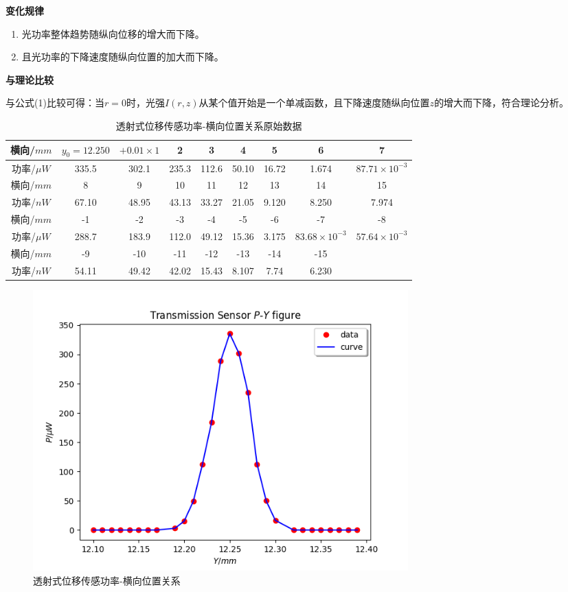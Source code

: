 \documentclass[a4paper,UTF8]{ctexart}
\begin{document}
{\bfseries 变化规律}

\begin{enumerate}
    \item 光功率整体趋势随纵向位移的增大而下降。
    \item 且光功率的下降速度随纵向位置的加大而下降。
\end{enumerate}

{\bfseries 与理论比较}

与公式(1)比较可得：当$r=0$时，光强$I(r,z)$从某个值开始是一个单减函数，且下降速度随纵向位置$z$的增大而下降，符合理论分析。

\begin{table}[H]
    \centering
    \begin{tabular}{|c|c|c|c|c|c|c|c|c|}
    \hline
        横向/$mm$ & $y_0 = 12.250$ & $+0.01 \times 1$ & 2 & 3 & 4 & 5 & 6 & 7 \\ \hline
        功率/$\mu W$ & 335.5 & 302.1 & 235.3 & 112.6 & 50.10 & 16.72 & 1.674 & $87.71 \times 10^{-3}$ \\ \hline
        横向/$mm$ & 8 & 9 & 10 & 11 & 12 & 13 & 14 & 15 \\ \hline
        功率/$n W$ & 67.10 & 48.95 & 43.13 & 33.27 & 21.05 & 9.120 & 8.250 & 7.974 \\ \hline
        横向/$mm$ & -1 & -2 & -3 & -4 & -5 & -6 & -7 & -8 \\ \hline
        功率/$\mu W$ & 288.7 & 183.9 & 112.0 & 49.12 & 15.36 & 3.175 & $83.68 \times 10^{-3}$ & $ 57.64\times 10^{-3}$ \\ \hline
        横向/$mm$ & -9 & -10 & -11 & -12 & -13 & -14 & -15 & ~ \\ \hline
        功率/$n W$ & 54.11 & 49.42 & 42.02 & 15.43 & 8.107 & 7.74 & 6.230 & ~ \\ \hline
    \end{tabular}
    \caption{透射式位移传感功率-横向位置关系原始数据}
\end{table}

\begin{figure}[H]
    \centering
    \begin{minipage}[b]{0.9\textwidth}
        \centering
        \includegraphics[width=0.7\textwidth]{./one_y.png}
        \caption{透射式位移传感功率-横向位置关系}
    \end{minipage}
\end{figure}
\end{document}
